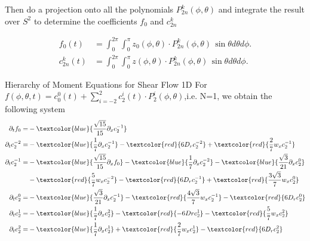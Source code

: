 \begin{frame}
\scriptsize
Then do a projection onto all the polynomials $P^{k}_{2n}(\phi, \theta)$ and integrate the result over $S^2$ to determine the coefficients $f_0$ and $c^k_{2n}$

\begin{align*}
	f_0(t) &=  \int_{0}^{2\pi} \int_{0}^{\pi} z_0(\phi, \theta) \cdot P^{k}_{2n}(\phi, \theta) \, \sin\theta d\theta d\phi. \\
	c^k_{2n}(t) &= \int_{0}^{2\pi} \int_{0}^{\pi} z(\phi, \theta) \cdot P^{k}_{2n}(\phi, \theta) \, \sin\theta d\theta d\phi.
\end{align*}

\end{frame}

\begin{frame}{Hierarchy of Moment Equations for Shear Flow 1D}
	\scriptsize
	For  $f(\phi, \theta, t) = c^0_0(t) + \sum_{i=-2}^{2} c^i_{2}(t) \cdot P^i_{2}(\phi, \theta)$,i.e. N=1, we obtain the following system
	\begin{align*}
		\partial_{t} f_0 = &-\textcolor{blue}{\frac{\sqrt{15}}{15}\partial_x c^{-1}_2}\\
		\partial_{t} c^{-2}_2 = &-\textcolor{blue}{\frac{1}{7} \partial_x c^{-1}_2} -\textcolor{red}{6D_rc^{-2}_2}+ \textcolor{red}{\frac{2}{7}w_xc^{-1}_2} \\
		\partial_{t} c^{-1}_2 = &-\textcolor{blue}{\frac{\sqrt{15}}{15}\partial_x f_0} - \textcolor{blue}{\frac{1}{7} \partial_x c^{-2}_2} - \textcolor{blue}{\frac{\sqrt{3}}{21}\partial_x c^0_2} \\ &-\textcolor{red}{\frac{5}{7}w_x c^{-2}_2} -\textcolor{red}{6D_r c^{-1}_2} +\textcolor{red}{\frac{3\sqrt{3}}{7}w_x c^0_2} \\
		\partial_{t} c^0_2 = &-\textcolor{blue}{\frac{\sqrt{3}}{21}\partial_x c^{-1}_2} -\textcolor{red}{\frac{4\sqrt{3}}{7}w_x c^{-1}_2} -\textcolor{red}{6D_r c^0_2} \\
		\partial_{t} c^1_2 = &-\textcolor{blue}{\frac{1}{7}\partial_x c^2_2} -\textcolor{red}{-6Dr c^{1}_2} -\textcolor{red}{\frac{5}{7}w_x c^{2}_2}\\
		\partial_{t} c^2_2 = &-\textcolor{blue}{\frac{1}{7}\partial_x c^1_2} +\textcolor{red}{\frac{2}{7}w_x c^{1}_2} -\textcolor{red}{6D_r c^{2}_2}
	\end{align*}
\end{frame}
